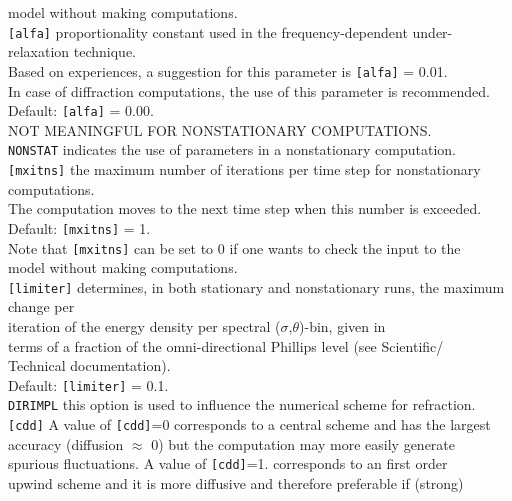 \documentclass[12pt]{book}
\begin{document}
\begin{tabbing}
                  model without making computations.\-\\
{\tt [alfa]}   \> proportionality constant used in the frequency-dependent under-relaxation technique.\+\\
                  Based on experiences, a suggestion for this parameter is {\tt [alfa]} = 0.01.\\
                  In case of diffraction computations, the use of this parameter is recommended.\\
                  Default: {\tt [alfa]} = 0.00.\\
                  NOT MEANINGFUL FOR NONSTATIONARY COMPUTATIONS.\-\\
{\tt NONSTAT}  \> indicates the use of parameters in a nonstationary computation.\\
{\tt [mxitns]} \> the maximum number of iterations per time step for nonstationary computations.\+\\
                  The computation moves to the next time step when this number is exceeded.\\
                  Default: {\tt [mxitns]} = 1.\\
                  Note that {\tt [mxitns]} can be set to 0 if one wants to check the input to the\\
                  model without making computations.\-\\
{\tt [limiter]}\> determines, in both stationary and nonstationary runs, the maximum change per\+\\
                  iteration of the energy density per spectral ($\sigma$,$\theta$)-bin, given in\\
                  terms of a fraction of the omni-directional Phillips level (see Scientific/\\
                  Technical documentation).\\
                  Default: {\tt [limiter]} = 0.1.\-\\
{\tt DIRIMPL}  \> this option is used to influence the numerical scheme for refraction.\\
{\tt [cdd]}    \> A value of {\tt [cdd]}=0 corresponds to a central scheme and has the largest\+\\
                  accuracy (diffusion $\approx$ 0) but the computation may more easily generate\\
                  spurious fluctuations. A value of {\tt [cdd]}=1. corresponds to an first order\\
                  upwind scheme and it is more diffusive and therefore preferable if (strong)\\

\end{tabbing}
\end{document}
